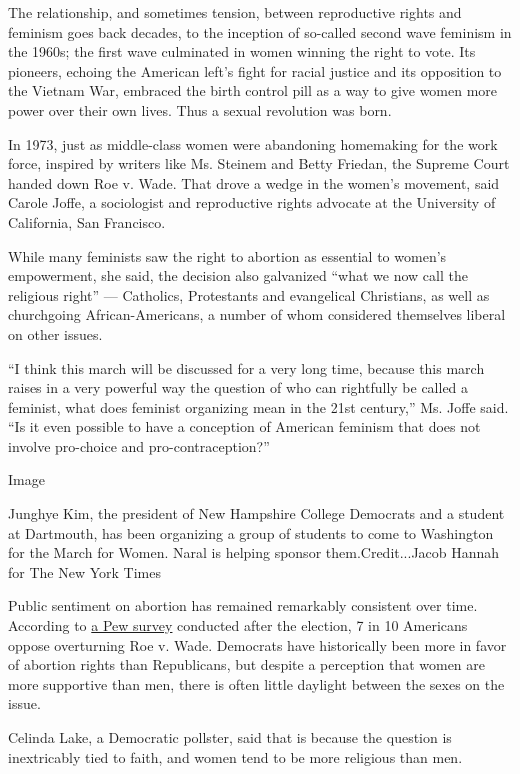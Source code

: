 The relationship, and sometimes tension, between reproductive rights and
feminism goes back decades, to the inception of so-called second wave
feminism in the 1960s; the first wave culminated in women winning the
right to vote. Its pioneers, echoing the American left's fight for
racial justice and its opposition to the Vietnam War, embraced the birth
control pill as a way to give women more power over their own lives.
Thus a sexual revolution was born.

In 1973, just as middle-class women were abandoning homemaking for the
work force, inspired by writers like Ms. Steinem and Betty Friedan, the
Supreme Court handed down Roe v. Wade. That drove a wedge in the women's
movement, said Carole Joffe, a sociologist and reproductive rights
advocate at the University of California, San Francisco.

While many feminists saw the right to abortion as essential to women's
empowerment, she said, the decision also galvanized ``what we now call
the religious right'' --- Catholics, Protestants and evangelical
Christians, as well as churchgoing African-Americans, a number of whom
considered themselves liberal on other issues.

``I think this march will be discussed for a very long time, because
this march raises in a very powerful way the question of who can
rightfully be called a feminist, what does feminist organizing mean in
the 21st century,'' Ms. Joffe said. ``Is it even possible to have a
conception of American feminism that does not involve pro-choice and
pro-contraception?''

Image

Junghye Kim, the president of New Hampshire College Democrats and a
student at Dartmouth, has been organizing a group of students to come to
Washington for the March for Women. Naral is helping sponsor
them.Credit...Jacob Hannah for The New York Times

Public sentiment on abortion has remained remarkably consistent over
time. According to
\href{http://www.pewresearch.org/fact-tank/2017/01/03/about-seven-in-ten-americans-oppose-overturning-roe-v-wade/}{a
Pew survey} conducted after the election, 7 in 10 Americans oppose
overturning Roe v. Wade. Democrats have historically been more in favor
of abortion rights than Republicans, but despite a perception that women
are more supportive than men, there is often little daylight between the
sexes on the issue.

Celinda Lake, a Democratic pollster, said that is because the question
is inextricably tied to faith, and women tend to be more religious than
men.

